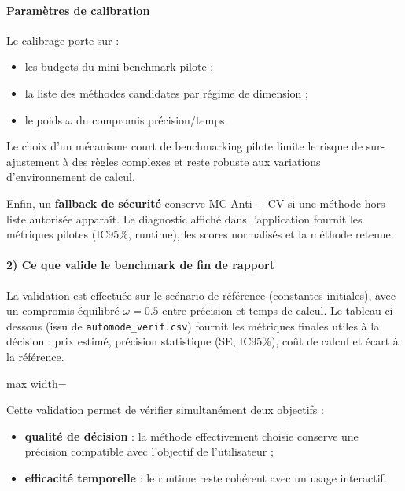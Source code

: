 ﻿\documentclass[11pt,a4paper]{article}
\begin{document}
\paragraph{Paramètres de calibration}
Le calibrage porte sur :
\begin{itemize}
    \item les budgets du mini-benchmark pilote ;
    \item la liste des méthodes candidates par régime de dimension ;
    \item le poids $\omega$ du compromis précision/temps.
\end{itemize}

Le choix d'un mécanisme court de benchmarking pilote limite le risque de sur-ajustement à des règles complexes et reste robuste aux variations d'environnement de calcul.

Enfin, un \textbf{fallback de sécurité} conserve MC Anti + CV si une méthode hors liste autorisée apparaît.
Le diagnostic affiché dans l'application fournit les métriques pilotes (IC95\%, runtime), les scores normalisés et la méthode retenue.

\paragraph{2) Ce que valide le benchmark de fin de rapport}
La validation est effectuée sur le scénario de référence (constantes initiales), avec un compromis équilibré $\omega=0.5$ entre précision et temps de calcul. Le tableau ci-dessous (issu de \texttt{automode\_verif.csv}) fournit les métriques finales utiles à la décision : prix estimé, précision statistique (SE, IC95\%), coût de calcul et écart à la référence.

\begin{table}[h!]
    \centering
    \caption{Validation du mode automatique (constantes initiales, $\omega=0.5$).}
    \label{tab:automode_verif}
    \begin{adjustbox}{max width=\textwidth}
    
    \end{adjustbox}
\end{table}

Cette validation permet de vérifier simultanément deux objectifs :
\begin{itemize}
    \item \textbf{qualité de décision} : la méthode effectivement choisie conserve une précision compatible avec l'objectif de l'utilisateur ;
    \item \textbf{efficacité temporelle} : le runtime reste cohérent avec un usage interactif.
\end{itemize}
\end{document}
